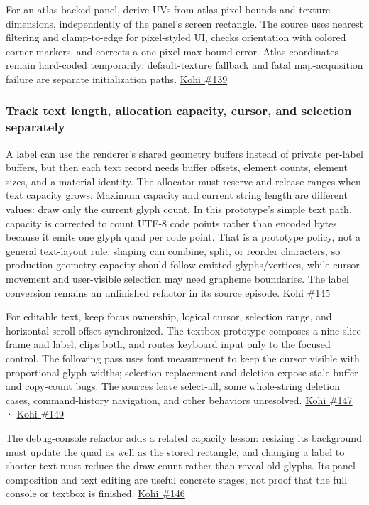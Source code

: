 For an atlas-backed panel, derive UVs from atlas pixel bounds and texture dimensions, independently of the panel's screen rectangle. The source uses nearest filtering and clamp-to-edge for pixel-styled UI, checks orientation with colored corner markers, and corrects a one-pixel max-bound error. Atlas coordinates remain hard-coded temporarily; default-texture fallback and fatal map-acquisition failure are separate initialization paths. \href{https://www.youtube.com/watch?v=-V5z1bVjl_c}{Kohi \#139}

\subsubsection{Track text length, allocation capacity, cursor, and selection separately}\label{track-text-length-allocation-capacity-cursor-and-selection-separately}

A label can use the renderer's shared geometry buffers instead of private per-label buffers, but then each text record needs buffer offsets, element counts, element sizes, and a material identity. The allocator must reserve and release ranges when text capacity grows. Maximum capacity and current string length are different values: draw only the current glyph count. In this prototype's simple text path, capacity is corrected to count UTF-8 code points rather than encoded bytes because it emits one glyph quad per code point. That is a prototype policy, not a general text-layout rule: shaping can combine, split, or reorder characters, so production geometry capacity should follow emitted glyphs/vertices, while cursor movement and user-visible selection may need grapheme boundaries. The label conversion remains an unfinished refactor in its source episode. \href{https://www.youtube.com/watch?v=HXJbWldxfj0}{Kohi \#145}

For editable text, keep focus ownership, logical cursor, selection range, and horizontal scroll offset synchronized. The textbox prototype composes a nine-slice frame and label, clips both, and routes keyboard input only to the focused control. The following pass uses font measurement to keep the cursor visible with proportional glyph widths; selection replacement and deletion expose stale-buffer and copy-count bugs. The sources leave select-all, some whole-string deletion cases, command-history navigation, and other behaviors unresolved. \href{https://www.youtube.com/watch?v=faESVT5N9gg}{Kohi \#147} · \href{https://www.youtube.com/watch?v=aWv2-QSOuO8}{Kohi \#149}

The debug-console refactor adds a related capacity lesson: resizing its background must update the quad as well as the stored rectangle, and changing a label to shorter text must reduce the draw count rather than reveal old glyphs. Its panel composition and text editing are useful concrete stages, not proof that the full console or textbox is finished. \href{https://www.youtube.com/watch?v=g7ZqqsMHZNo}{Kohi \#146}

